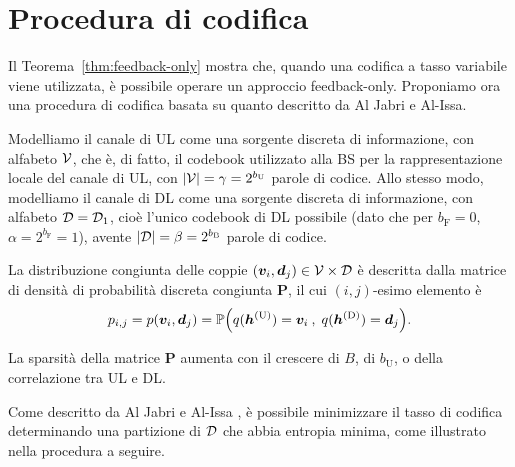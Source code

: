 \section{Procedura di codifica}
\label{sec:procedure}

Il Teorema~\ref{thm:feedback-only} mostra che, quando una codifica a tasso
variabile viene utilizzata, è possibile operare un approccio feedback-only.
Proponiamo ora una procedura di codifica basata su quanto descritto da Al Jabri
e Al-Issa.\cite{10.1007/BFb0024445}

Modelliamo il canale di UL come una sorgente discreta di informazione, con
alfabeto \(\mathcal{V}\), che è, di fatto, il codebook utilizzato alla BS per la
rappresentazione locale del canale di UL, con \(\abs{\set{V}} = \gamma =
2^{b_\mathrm{U}}\) parole di codice. Allo stesso modo, modelliamo il canale di
DL come una sorgente discreta di informazione, con alfabeto \(\mathcal{D} =
\mathcal{D}_1\), cioè l'unico codebook di DL possibile (dato che per \(b_\mathrm{F}
= 0\), \(\alpha = 2^{b_\mathrm{F}} = 1\)), avente \(\abs{\set{D}} = \beta =
2^{b_\mathrm{B}}\) parole di codice.

La distribuzione congiunta delle coppie \((\bm{v}_i,\bm{d}_j) \in
\mathcal{V} \times \mathcal{D}\) è descritta dalla matrice di densità di probabilità
discreta congiunta \(\bm{P}\), il cui \((i,j)\)-esimo elemento è
\begin{equation}
    p_{i,j} = p(\bm{v}_i, \bm{d}_j) = \prob{
        q(\bm{h}^\mathrm{(U)}) = \bm{v}_i \:,\;
        q(\bm{h}^\mathrm{(D)}) = \bm{d}_j
    } .
\end{equation}

La sparsità della matrice \(\bm{P}\) aumenta con il crescere di \(B\), di
\(b_\mathrm{U}\), o della correlazione tra UL e DL.

Come descritto da Al Jabri e Al-Issa \cite{10.1007/BFb0024445}, è possibile
minimizzare il tasso di codifica determinando una partizione di \(\mathcal{D}\) che
abbia entropia minima, come illustrato nella procedura a seguire.

